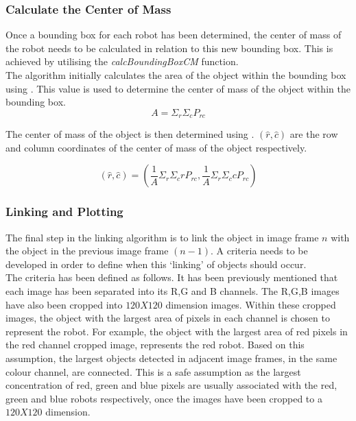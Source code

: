 \documentclass{article}
\begin{document}
\subsubsection{Calculate the Center of Mass}
\label{sec:cm}
Once a bounding box for each robot has been determined, the center of mass of the robot needs to be calculated in relation to this new bounding box. This is achieved by utilising the \textit{calcBoundingBoxCM} function.\\

The algorithm initially calculates the area of the object within the bounding box using . This value is used to determine the center of mass of the object within the bounding box.\\

\begin{equation}
A = \Sigma_{r}\Sigma_{c}P_{rc} 
\label{eqn:area}
\end{equation}

The center of mass of the object is then determined using . $(\widehat{r}, \widehat{c})$ are the row and column coordinates of the center of mass of the object respectively.

\begin{equation}
(\widehat{r}, \widehat{c}) = (\frac{1}{A}\Sigma_{r}\Sigma_{c}r P_{rc}, \frac{1}{A}\Sigma_{r}\Sigma_{c}c P_{rc}) 
\label{eqn:cm}
\end{equation}

\subsubsection{Linking and Plotting}
\label{sec:linkplot}
The final step in the linking algorithm is to link the object in image frame $n$ with the object in the previous image frame $(n-1)$. A criteria needs to be developed in order to define when this `linking' of objects should occur. \\

The criteria has been defined as follows. It has been previously mentioned that each image has been separated into its R,G and B channels. The R,G,B images have also been cropped into $120X120$ dimension images. Within these cropped images, the object with the largest area of pixels in each channel is chosen to represent the robot. For example, the object with the largest area of red pixels in the red channel cropped image, represents the red robot. Based on this assumption, the largest objects detected in adjacent image frames, in the same colour channel, are connected. This is a safe assumption as the largest concentration of  red, green and blue pixels are usually associated with the red, green and blue robots respectively, once the images have been cropped to a $120X120$ dimension. \\
\end{document}

